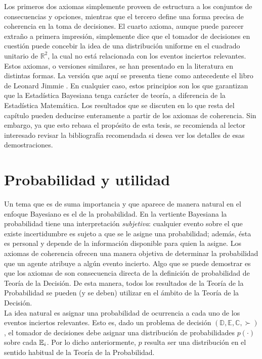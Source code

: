 Los primeros dos axiomas simplemente proveen de estructura a los conjuntos de consecuencias y opciones, mientras que el tercero define una forma precisa de coherencia en la toma de decisiones. El cuarto axioma, aunque puede parecer extraño a primera impresión, simplemente dice que el tomador de decisiones en cuestión puede concebir la idea de una distribución uniforme en el cuadrado unitario de $\mathbb{R}^2$, la cual no está relacionada con los eventos inciertos relevantes.\\

Estos axiomas, o versiones similares, se han presentado en la literatura en distintas formas. La versión que aquí se presenta tiene como antecedente el libro de Leonard Jimmie \cite{savage}. En cualquier caso, estos principios son los que garantizan que la Estadística Bayesiana tenga carácter de teoría, a diferencia de la Estadística Matemática. Los resultados que se discuten en lo que resta del capítulo pueden deducirse enteramente a partir de los axiomas de coherencia. Sin embargo, ya que esto rebasa el propósito de esta tesis, se recomienda al lector interesado revisar la bibliografía recomendada si desea ver los detalles de esas demostraciones.






\section{Probabilidad y utilidad}

Un tema que es de suma importancia y que aparece de manera natural en el enfoque Bayesiano es el de la probabilidad. En la vertiente Bayesiana la probabilidad tiene una interpretación \textit{subjetiva}: cualquier evento sobre el que existe incertidumbre es sujeto a que se le asigne una probabilidad; además, ésta es personal y depende de la información disponible para quien la asigne. Los axiomas de coherencia ofrecen una manera objetiva de determinar la probabilidad que un agente atribuye a algún evento incierto. Algo que se puede demostrar es que los axiomas de \cite{kolmogorov} son consecuencia directa de la definición de probabilidad de Teoría de la Decisión. De esta manera, todos los resultados de la Teoría de la Probabilidad se pueden (y se deben) utilizar en el ámbito de la Teoría de la Decisión.\\

La idea natural es asignar una probabilidad de ocurrencia a cada uno de los eventos inciertos relevantes. Esto es, dado un problema de decisión $( \mathbb{D}, \mathbb{E}, \mathbb{C}, \succ )$, el tomador de decisiones debe asignar una distribución de probabilidades $p(\cdot)$ sobre cada $\mathbb{E}_i$. Por lo dicho anteriormente, $p$ resulta ser una distribución en el sentido habitual de la Teoría de la Probabilidad. \\

